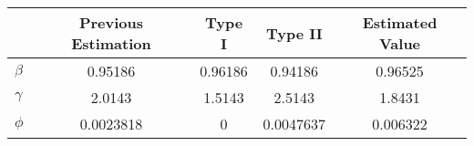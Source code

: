 \begin{tabular}{lcccc}
& Previous Estimation & Type I & Type II & Estimated Value \\ 
\hline 
$\beta$ & 0.95186 & 0.96186 & 0.94186 & 0.96525 \\ 
$\gamma$ & 2.0143 & 1.5143 & 2.5143 & 1.8431 \\ 
$\phi$ & 0.0023818 & 0 & 0.0047637 & 0.006322 \\ 
\hline 
\end{tabular}